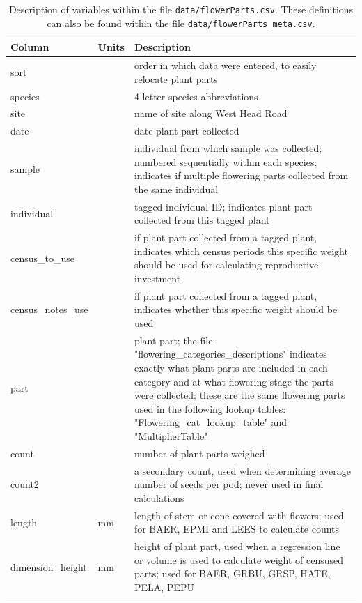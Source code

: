 \documentclass[10pt,twoside]{article}\usepackage[]{graphicx}\usepackage[]{color}
\begin{document}
\begingroup\small
\begin{longtable}{p{4cm}p{2cm}p{10cm}}
\caption{Description of variables within the file \texttt{data/flowerParts.csv}. These definitions can also be found within the file \texttt{data/flowerParts\_meta.csv}.} \\ 
  \hline
Column & Units & Description \\ 
  \hline
sort &  & order in which data were entered, to easily relocate plant parts \\ 
  species &  & 4 letter species abbreviations \\ 
  site &  & name of site along West Head Road \\ 
  date &  & date plant part collected \\ 
  sample &  & individual from which sample was collected; numbered sequentially within each species; indicates if multiple flowering parts collected from the same individual \\ 
  individual &  & tagged individual ID; indicates plant part collected from this tagged plant \\ 
  census\_to\_use &  & if plant part collected from a tagged plant, indicates which census periods this specific weight should be used for calculating reproductive investment \\ 
  census\_notes\_use &  & if plant part collected from a tagged plant, indicates whether this specific weight should be used  \\ 
  part &  & plant part; the file "flowering\_categories\_descriptions" indicates exactly what plant parts are included in each category and at what flowering stage the parts were collected; these are the same flowering parts used in the following lookup tables: "Flowering\_cat\_lookup\_table" and "MultiplierTable" \\ 
  count &  & number of plant parts weighed \\ 
  count2 &  & a secondary count, used when determining average number of seeds per pod; never used in final calculations \\ 
  length & mm & length of stem or cone covered with flowers; used for BAER, EPMI and LEES to calculate counts \\ 
  dimension\_height & mm & height of plant part, used when a regression line or volume is used to calculate weight of censused parts; used for BAER, GRBU, GRSP, HATE, PELA, PEPU \\ 

\end{longtable}
\end{document}
